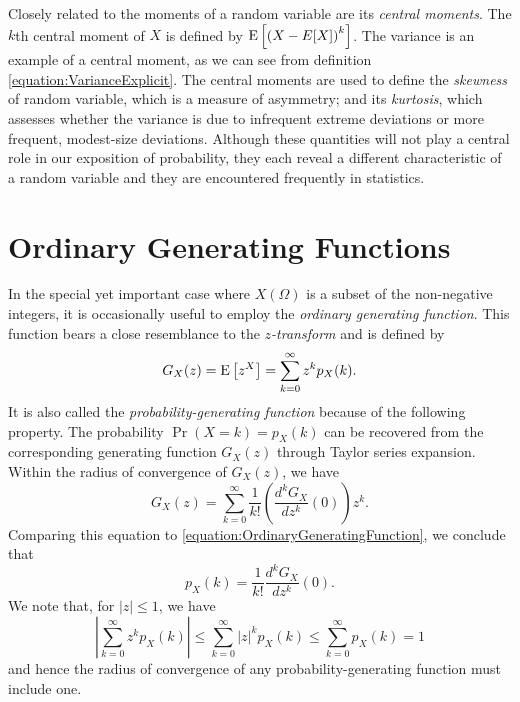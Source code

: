 Closely related to the moments of a random variable are its \emph{central moments}. 
The $k$th central moment of $X$ is defined by $\mathrm{E} \left[ \left( X - E[X] \right)^k \right]$.
The variance is an example of a central moment, as we can see from definition \eqref{equation:VarianceExplicit}.
The central moments are used to define the \emph{skewness} of random variable, which is a measure of asymmetry; and its \emph{kurtosis}, which assesses whether the variance is due to infrequent extreme deviations or more frequent, modest-size deviations.
Although these quantities will not play a central role in our exposition of probability, they each reveal a different characteristic of a random variable and they are encountered frequently in statistics. 

\iffalse
\section{Ordinary Generating Functions}
\label{section:OrdinaryGeneratingFunctions}

In the special yet important case where $X(\Omega)$ is a subset of the non-negative integers, it is occasionally useful to employ the \emph{ordinary generating function}. 
This function bears a close resemblance to the \emph{$z$-transform} and is defined by 
\begin{equation} \label{equation:OrdinaryGeneratingFunction}
G_X(z) = \mathrm{E} \left[ z^X \right] = \sum_{k=0}^{\infty} z^k p_X (k) .
\end{equation}
It is also called the \emph{probability-generating function} because of the following property. 
The probability $\Pr (X = k) = p_X(k)$ can be recovered from the corresponding generating function $G_X (z)$ through Taylor series expansion.
Within the radius of convergence of $G_X(z)$, we have
\begin{equation*}
G_X(z) = \sum_{k=0}^{\infty} \frac{1}{k!} \left( \frac{d^k G_X}{dz^k}(0) \right) z^k .
\end{equation*}
Comparing this equation to \eqref{equation:OrdinaryGeneratingFunction}, we conclude that
\begin{equation*}
p_X(k) = \frac{1}{k!} \frac{d^k G_X}{dz^k} (0) .
\end{equation*}
We note that, for $|z| \leq 1$, we have
\begin{equation*}
\left| \sum_{k=0}^{\infty} z^k p_X(k) \right|
\leq \sum_{k=0}^{\infty} |z|^k p_X(k)
\leq \sum_{k=0}^{\infty} p_X(k) = 1
\end{equation*}
and hence the radius of convergence of any probability-generating function must include one.

